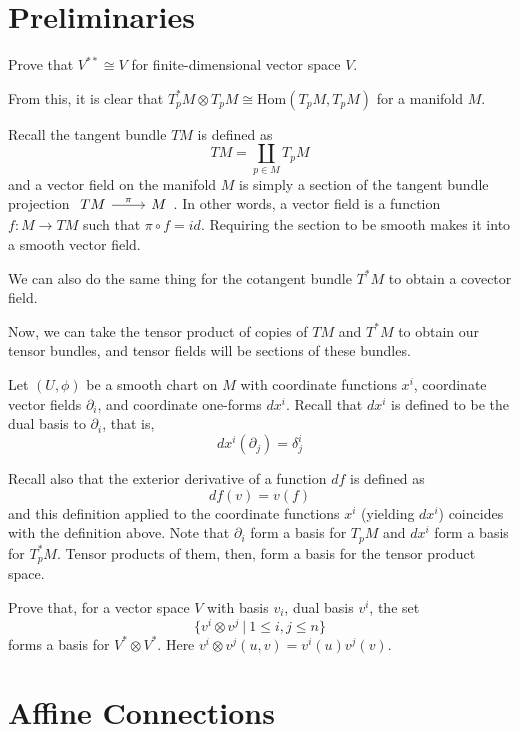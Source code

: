 \documentclass[../main.tex]{subfiles}
\begin{document}
\section{Preliminaries}

\begin{hw}
    Prove that $V^{**}\cong V$ for finite-dimensional vector space $V$.
\end{hw}

From this, it is clear that $T_p^*M\otimes T_pM\cong \textrm{Hom}(T_pM,T_pM)$
for a manifold $M$.

Recall the tangent bundle $TM$ is defined as
\[
    TM = \coprod_{p\in M} T_pM
\]
and a vector field on the manifold $M$ is simply a section of the tangent bundle
projection
$\begin{tikzcd}TM\arrow{r}{\pi} &M\end{tikzcd}$. In other words, a vector field
    is a function $f:M\to TM$ such that $\pi\circ f = id$.
Requiring the section to be smooth makes it into a smooth vector field.

We can also do the same thing for the cotangent bundle $T^*M$ to obtain a
covector field.

Now, we can take the tensor product of copies of $TM$ and $T^*M$ to obtain our
tensor bundles, and tensor fields will be sections of these bundles.

Let $(U,\phi)$ be a smooth chart on $M$ with coordinate functions $x^i$,
coordinate vector fields $\partial_i$, and coordinate one-forms $dx^i$. Recall
that $dx^i$ is defined to be the dual basis to $\partial_i$, that is,
\[
    dx^i(\partial_j) = \delta^i_j
\]

Recall also that the exterior derivative of a function $df$ is defined as
\[
    df(v) = v(f)
\]
and this definition applied to the coordinate functions $x^i$ (yielding $dx^i$)
coincides with the definition above. Note that $\partial_i$ form a basis for
$T_pM$ and $dx^i$ form a basis for $T_p^*M$. Tensor products of them, then, form
a basis for the tensor product space.

\begin{hw}
    Prove that, for a vector space $V$ with basis $v_i$, dual basis $v^i$, the
    set
    \[
        \{v^i\otimes v^j\ |\ 1\leq i,j\leq n\}
    \]
    forms a basis for $V^*\otimes V^*$. Here $v^i\otimes v^j(u,v) =
    v^i(u)v^j(v)$.
\end{hw}

\section{Affine Connections}
\end{document}
